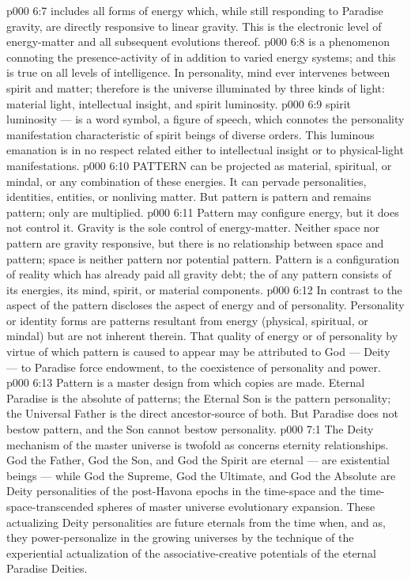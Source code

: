 \vs p000 6:7 \bibnobreakspace {} includes all forms of energy which, while still responding to Paradise gravity, are directly responsive to linear gravity. This is the electronic level of energy\hyp{}matter and all subsequent evolutions thereof.
\vs p000 6:8 \pc {} is a phenomenon connoting the presence\hyp{}activity of  in addition to varied energy systems; and this is true on all levels of intelligence. In personality, mind ever intervenes between spirit and matter; therefore is the universe illuminated by three kinds of light: material light, intellectual insight, and spirit luminosity.
\vs p000 6:9 \pc {} spirit luminosity --- is a word symbol, a figure of speech, which connotes the personality manifestation characteristic of spirit beings of diverse orders. This luminous emanation is in no respect related either to intellectual insight or to physical\hyp{}light manifestations.
\vs p000 6:10 \pc PATTERN can be projected as material, spiritual, or mindal, or any combination of these energies. It can pervade personalities, identities, entities, or nonliving matter. But pattern is pattern and remains pattern; only  are multiplied.
\vs p000 6:11 Pattern may configure energy, but it does not control it. Gravity is the sole control of energy\hyp{}matter. Neither space nor pattern are gravity responsive, but there is no relationship between space and pattern; space is neither pattern nor potential pattern. Pattern is a configuration of reality which has already paid all gravity debt; the  of any pattern consists of its energies, its mind, spirit, or material components.
\vs p000 6:12 In contrast to the aspect of the  pattern discloses the  aspect of energy and of personality. Personality or identity forms are patterns resultant from energy (physical, spiritual, or mindal) but are not inherent therein. That quality of energy or of personality by virtue of which pattern is caused to appear may be attributed to God --- Deity --- to Paradise force endowment, to the coexistence of personality and power.
\vs p000 6:13 Pattern is a master design from which copies are made. Eternal Paradise is the absolute of patterns; the Eternal Son is the pattern personality; the Universal Father is the direct ancestor\hyp{}source of both. But Paradise does not bestow pattern, and the Son cannot bestow personality.
\vs p000 7:1 The Deity mechanism of the master universe is twofold as concerns eternity relationships. God the Father, God the Son, and God the Spirit are eternal --- are existential beings --- while God the Supreme, God the Ultimate, and God the Absolute are  Deity personalities of the post\hyp{}Havona epochs in the time\hyp{}space and the time\hyp{}space\hyp{}transcended spheres of master universe evolutionary expansion. These actualizing Deity personalities are future eternals from the time when, and as, they power\hyp{}personalize in the growing universes by the technique of the experiential actualization of the associative\hyp{}creative potentials of the eternal Paradise Deities.
